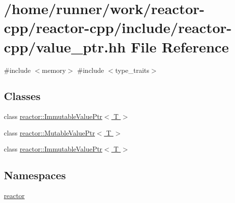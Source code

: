 \hypertarget{value__ptr_8hh}{}\section{/home/runner/work/reactor-\/cpp/reactor-\/cpp/include/reactor-\/cpp/value\+\_\+ptr.hh File Reference}
\label{value__ptr_8hh}
{\ttfamily \#include $<$memory$>$}\newline
{\ttfamily \#include $<$type\+\_\+traits$>$}\newline
\subsection*{Classes}
\begin{DoxyCompactItemize}
\item 
class \hyperlink{classreactor_1_1ImmutableValuePtr}{reactor\+::\+Immutable\+Value\+Ptr$<$ T $>$}
\item 
class \hyperlink{classreactor_1_1MutableValuePtr}{reactor\+::\+Mutable\+Value\+Ptr$<$ T $>$}
\item 
class \hyperlink{classreactor_1_1ImmutableValuePtr}{reactor\+::\+Immutable\+Value\+Ptr$<$ T $>$}
\end{DoxyCompactItemize}
\subsection*{Namespaces}
\begin{DoxyCompactItemize}
\item 
 \hyperlink{namespacereactor}{reactor}
\end{DoxyCompactItemize}

